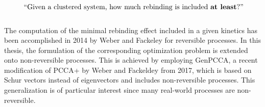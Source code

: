 \begin{equation*}
\textrm{	``Given a clustered system, how much rebinding is included \textbf{at least}?''}
\end{equation*}
\\

The computation of the minimal rebinding effect included in a given kinetics has been accomplished in 2014 by Weber and Fackeley\cite{weber2014} for reversible processes.
In this thesis, the formulation of the corresponding optimization problem is extended onto non-reversible processes.
This is achieved by employing GenPCCA, a recent modification of PCCA+ by Weber and Fackeldey\cite{Weber2017} from 2017, which is based on Schur vectors instead of eigenvectors and includes non-reversible processes.
This generalization is of particular interest since many real-world processes are non-reversible. %
\clearpage


